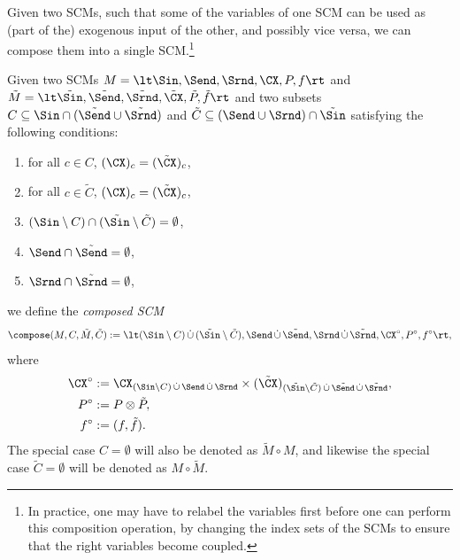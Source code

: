 Given two SCMs, such that some of the variables of one SCM can be used as (part of the) exogenous input of the other, and possibly vice versa, we can compose them into a single SCM.\footnote{In practice, one may have to relabel the variables first before one can perform this composition operation, by changing the index sets of the SCMs to ensure that the right variables become coupled.}
\begin{Def}\label{def:compose_scm}
  Given two SCMs $M = \lt \Sin, \Send, \Srnd, \CX, P, f \rt$ and $\tilde M = \lt \tilde \Sin, \tilde \Send, \tilde \Srnd, \tilde \CX, \tilde P, \tilde f \rt$ and two subsets $C \subseteq \Sin \cap (\tilde \Send \cup \tilde \Srnd)$ and $\tilde C \subseteq (\Send \cup \Srnd) \cap \tilde \Sin$ satisfying the following conditions:
  \begin{enumerate}
    \item for all $c \in C$, $(\CX)_c = (\tilde \CX)_c$,
    \item for all $c \in \tilde C$, $(\CX)_c = (\tilde \CX)_c$,
    \item $(\Sin \sm C) \cap (\tilde \Sin \sm \tilde C) = \emptyset$,
    \item $\Send \cap \tilde \Send = \emptyset$,
    \item $\Srnd \cap \tilde \Srnd = \emptyset$,
  \end{enumerate}
  we define the \emph{composed SCM}
  $$\compose(M,C,\tilde{M},\tilde{C}) := \lt (\Sin \sm C) \dcup (\tilde \Sin \sm \tilde C), \Send \dcup \tilde \Send, \Srnd \dcup \tilde \Srnd, \CX^\circ, P^\circ, f^\circ \rt,$$
  where
  \begin{align*}
    \CX^\circ &:= \CX_{(\Sin \sm C) \dcup \Send \dcup \Srnd} \times (\tilde \CX)_{(\tilde \Sin \sm \tilde C) \dcup \tilde \Send \dcup \tilde \Srnd}, \\
    P^\circ &:= P \otimes \tilde P, \\
    f^\circ &:= (f, \tilde f).
  \end{align*}
  The special case $C = \emptyset$ will also be denoted as $\tilde M \circ M$, and likewise the special case $\tilde C = \emptyset$ will be denoted as $M \circ \tilde M$.
\end{Def}

